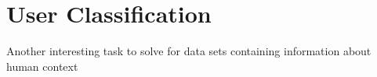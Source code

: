 \section{User Classification}
Another interesting task to solve for data sets containing information about human context
